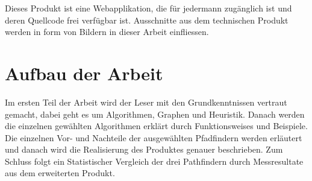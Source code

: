 Dieses Produkt ist eine Webapplikation, die für jedermann zugänglich ist
und deren Quellcode frei verfügbar ist. Ausschnitte aus dem technischen
Produkt werden in form von Bildern in dieser Arbeit einfliessen.

\section{Aufbau der Arbeit}

Im ersten Teil der Arbeit wird der Leser mit den Grundkenntnissen
vertraut gemacht, dabei geht es um Algorithmen, Graphen und Heuristik.
Danach werden die einzelnen gewählten Algorithmen erklärt durch
Funktionsweises und Beispiele. Die einzelnen Vor- und Nachteile der
ausgewählten Pfadfindern werden erläutert und danach wird die
Realisierung des Produktes genauer beschrieben. Zum Schluss folgt ein
Statistischer Vergleich der drei Pathfindern durch Messresultate aus dem
erweiterten Produkt.
